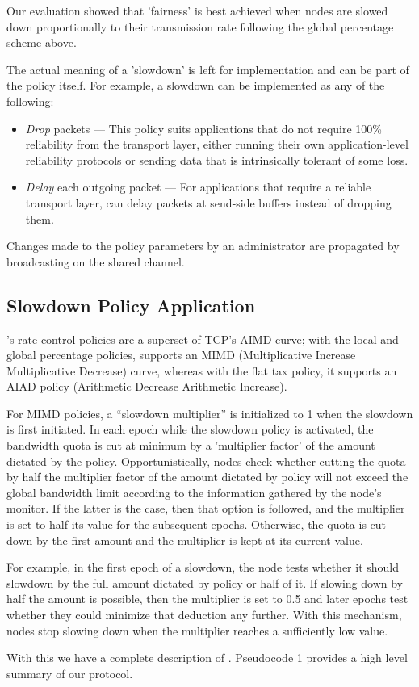 Our evaluation showed that 'fairness' is best achieved when nodes are slowed down proportionally to their transmission rate following the global percentage scheme above.

The actual meaning of a 'slowdown' is left for implementation and can be part of the policy itself. For example, a slowdown can be implemented as any of the following:
\begin{itemize}
\item \emph{Drop} packets --- This policy suits applications that do not require 100\% reliability from the transport layer, either running their own application-level reliability protocols or sending data that is intrinsically tolerant of some loss.
\item \emph{Delay} each outgoing packet --- For applications that require a reliable transport layer, \sysname{} can delay packets at send-side buffers instead of dropping them.
\end{itemize}

Changes made to the policy parameters by an administrator are propagated by broadcasting on the shared channel.

\subsection{Slowdown Policy Application}
\sysname{}'s rate control policies are a superset of TCP's AIMD curve; with the local and global percentage policies, \sysname{} supports an MIMD (Multiplicative Increase Multiplicative Decrease) curve, whereas with the flat tax policy, it supports an AIAD policy (Arithmetic Decrease Arithmetic Increase).

For MIMD policies, a ``slowdown multiplier'' is initialized to 1 when the slowdown is first initiated. In each epoch while the slowdown policy is activated, the bandwidth quota is cut at minimum by a 'multiplier factor' of the amount dictated by the policy. Opportunistically, nodes check whether cutting the quota by half the multiplier factor of the amount dictated by policy will not exceed the global bandwidth limit according to the information gathered by the node's monitor. If the latter is the case, then that option is followed, and the multiplier is set to half its value for the subsequent epochs. Otherwise, the quota is cut down by the first amount and the multiplier is kept at its current value.

For example, in the first epoch of a slowdown, the node tests whether it should slowdown by the full amount dictated by policy or half of it. If slowing down by half the amount is possible, then the multiplier is set to 0.5 and later epochs test whether they could minimize that deduction any further. With this mechanism, nodes stop slowing down when the multiplier reaches a sufficiently low value.

With this we have a complete description of \sysname{}. Pseudocode 1 provides a high level summary of our protocol. 
